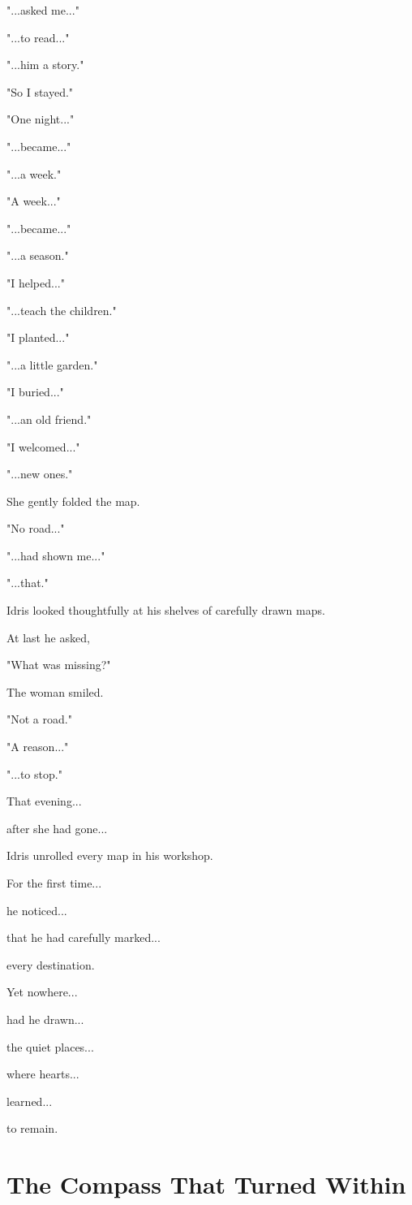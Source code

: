 \documentclass[12pt,openany]{book}
\begin{document}
"...asked me..."

"...to read..."

"...him a story."

"So I stayed."

"One night..."

"...became..."

"...a week."

"A week..."

"...became..."

"...a season."

"I helped..."

"...teach the children."

"I planted..."

"...a little garden."

"I buried..."

"...an old friend."

"I welcomed..."

"...new ones."

She gently folded the map.

"No road..."

"...had shown me..."

"...that."

Idris looked thoughtfully at his shelves of carefully drawn maps.

At last he asked,

"What was missing?"

The woman smiled.

"Not a road."

"A reason..."

"...to stop."

That evening...

after she had gone...

Idris unrolled every map in his workshop.

For the first time...

he noticed...

that he had carefully marked...

every destination.

Yet nowhere...

had he drawn...

the quiet places...

where hearts...

learned...

to remain.
\section*{The Compass That Turned Within}
\end{document}

